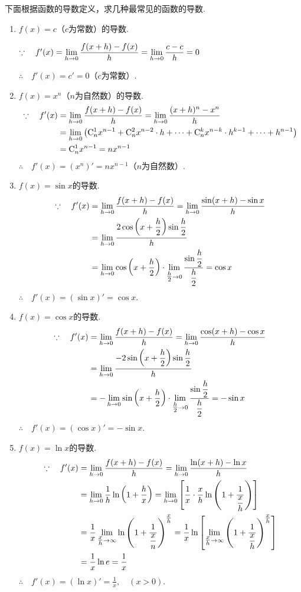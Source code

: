 下面根据函数的导数定义，求几种最常见的函数的导数.
\begin{enumerate}
    \item $f(x)=c$（$c$为常数）的导数.

    $\because\quad f'(x)=\lim\limits_{h\to 0}\dfrac{f(x+h)-f(x)}{h}=\lim\limits_{h\to 0}\dfrac{c-c}{h}=0$

$\therefore\quad    f'(x)=c'=0$（$c$为常数）.
    \item $f(x)=x^n$（$n$为自然数）的导数.
\[\begin{split}
    \because\quad f'(x)&=\lim\limits_{h\to 0}\dfrac{f(x+h)-f(x)}{h}=\lim\limits_{h\to 0}\dfrac{(x+h)^n-x^n}{h}\\
&=\lim\limits_{h\to 0}\left({\rm C}^1_n x^{n-1}+{\rm C}^2_nx^{n-2}\cdot h+\cdots+{\rm C}^k_nx^{n-k}\cdot h^{k-1}+\cdots +h^{n-1}\right)\\
&={\rm C}^1_nx^{n-1}=nx^{n-1}
\end{split}\]
$\therefore\quad f'(x)=(x^n)'=nx^{n-1}$（$n$为自然数）.
    \item $f(x)=\sin x$的导数.
    \[\begin{split}
        \because\quad f'(x)&=\lim\limits_{h\to 0}\dfrac{f(x+h)-f(x)}{h}=\lim\limits_{h\to 0}\dfrac{\sin (x+h)-\sin x}{h}\\
    &=\lim\limits_{h\to 0}\dfrac{2\cos \left(x+\dfrac{h}{2}\right)\sin \dfrac{h}{2}}{h}\\
    &=\lim\limits_{h\to 0}\cos \left(x+\dfrac{h}{2}\right)\cdot \lim\limits_{\tfrac{h}{2}\to 0}\dfrac{\sin\dfrac{h}{2}}{\dfrac{h}{2}}=\cos x
    \end{split}\]
    $\therefore\quad f'(x)=(\sin x)'=\cos x$.

\item $f(x)=\cos x$的导数.
\[\begin{split}
    \because\quad f'(x)&=\lim\limits_{h\to 0}\dfrac{f(x+h)-f(x)}{h}=\lim\limits_{h\to 0}\dfrac{\cos (x+h)-\cos x}{h}\\
&=\lim\limits_{h\to 0}\dfrac{-2\sin \left(x+\dfrac{h}{2}\right)\sin \dfrac{h}{2}}{h}\\
&=-\lim\limits_{h\to 0}\sin \left(x+\dfrac{h}{2}\right)\cdot \lim\limits_{\tfrac{h}{2}\to 0}\dfrac{\sin\dfrac{h}{2}}{\dfrac{h}{2}}=-\sin x
\end{split}\]
$\therefore\quad f'(x)=(\cos x)'=-\sin x$.

\item $f(x)=\ln x$的导数.
\[\begin{split}
    \because\quad f'(x)&=\lim\limits_{h\to 0}\dfrac{f(x+h)-f(x)}{h}=\lim\limits_{h\to 0}\dfrac{\ln (x+h)-\ln x}{h}\\
&=\lim\limits_{h\to 0}\dfrac{1}{h}\ln\left(1+\dfrac{h}{x}\right)=\lim\limits_{h\to 0}\left[\dfrac{1}{x}\cdot \dfrac{x}{h}\ln\left(1+\dfrac{1}{\dfrac{x}{h}}\right)\right]\\
&=\dfrac{1}{x}\lim_{\tfrac{x}{h}\to \infty}\ln\left(1+\dfrac{1}{\dfrac{x}{n}}\right)^{\tfrac{x}{h}}=\dfrac{1}{x}\ln\left[\lim_{\tfrac{x}{h}\to\infty}\left(1+\dfrac{1}{\dfrac{x}{h}}\right)^{\tfrac{x}{h}}\right]\\
&=\dfrac{1}{x}\ln e=\dfrac{1}{x}
\end{split}\]
$\therefore\quad f'(x)=(\ln x)'=\frac{1}{x},\quad (x>0)$.
\end{enumerate}

